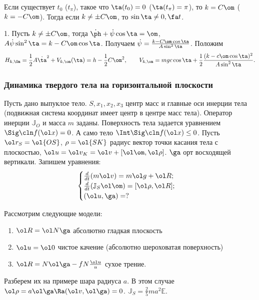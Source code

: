 \documentclass[a4paper,12pt]{article}
\def\w{\ol\om}
\def\g{\ol\ga}
\def\p{\ol\rho}
\def\r{\ol r}
\def\v{\ol v}
\def\vR{\ol R}
\def\JO{{\mathbb{J}_O}}
\def\JS{{\mathbb{J}_S}}
\def\d{\dot}
\begin{document}
\begin{note}
Если существует $t_0$ ($t_\pi$), такое что $\ta(t_0)=0$ ($\ta(t_\pi)=\pi$), то $k=C\om$
($k=-C\om$). Тогда если $k\ne \pm C\om$, то $\sin\ta\ne0,\fa t$.
\end{note}

1. Пусть $k\ne\pm C\om$, тогда
$\d\ph+\d\psi\cos\ta=\om$,
$A\d\psi\sin^2\ta=k-C\om\cos\ta$. Получаем
$\d\psi=\frac{k-C\om\cos\ta}{A\sin^2\ta}$. Положим
$$
H_{k,\Om}=\frac12A\d\ta^2+V_{k,\om}(\ta)=h-\frac12C\om^2,\qquad
V_{k,\om}=mgc\cos\ta+\frac12\frac{(k-c\om\cos\ta)^2}{A\sin^2\ta}.
$$

\subsubsection{Динамика твердого тела на горизонтальной плоскости}

Пусть дано выпуклое тело. $S,x_1,x_2,x_3$ центр масс и главные
оси инерции тела (подвижная система координат имеет центр в центре
масс тела). Оператор инерции $\JO$ и масса $m$ заданы. Поверхность тела задается уравнением
$\Sig\cln f(\ol x)=0$. А само тело $\Int\Sig\cln f(\ol x)\le 0$. Пусть $\r_S=\ol {OS}$, $\rho=\ol {SK}$ радиус
вектор точки касания тела с плоскостью, $\ol u=\v_K=\v+[\w,\p]$.
$\ga$ орт восходящей вертикали. Запишем уравнения:
$$
\begin{cases}
\frac d{dt}(m\v)=m\ol g+\vR;\\
\frac d{dt}(\JS\w)=[\p,\vR];\\
(\ol u,\ga)=?
\end{cases}
$$

Рассмотрим следующие модели:
\begin{enumerate}
\item $\ol R=\ol N\ga$ абсолютно гладкая плоскость
\item $\ol u=\ol0$ чистое качение (абсолютно шероховатая поверхность)
\item $\ol R= N\g-f N\frac{\ol u}{u}$ сухое трение.
\end{enumerate}

Разберем их на примере шара радиуса $a$. В этом случае
$\p=a\g\Ra(\v,\g)=0$.
$\JS=\frac25ma^2\mathbb{E}$.
\end{document}
